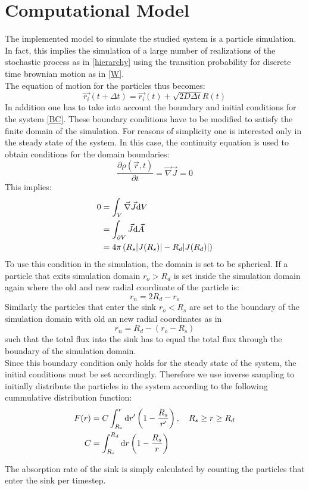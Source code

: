 \section{Computational Model}

The implemented model to simulate the studied system is a particle simulation. In fact, this implies the simulation of a large number of realizations of the stochastic process as in \eqref{hierarchy} using the transition probability for discrete time brownian motion as in \eqref{W}.\\
The equation of motion for the particles thus becomes:
\begin{equation}
    \vec{r_i}(t + \Delta t) = \vec{r_i}(t) + \sqrt{2 D \Delta t}R(t)
    \label{computational eqm}
\end{equation}
In addition one has to take into account the boundary and initial conditions for the system \eqref{BC}. These boundary conditions have to be modified to satisfy the finite domain of the simulation.
For reasons of simplicity one is interested only in the steady state of the system.
In this case, the continuity equation is used to obtain conditions for the domain boundaries:
\begin{equation}
    \frac{\partial \rho(\vec{r},t)}{\partial t} = \vec{\nabla} \vec{J} = 0
\end{equation}
This implies:
\begin{align}
    0   &= \int_V \vec{\nabla}\vec{J} {\rm d} V \nonumber \\
    &= \int_{\partial V} \vec{J} {\rm d} \vec{A} \nonumber \\
    &= 4 \pi \left( R_s |J(R_s)| - R_d |J(R_d)| \right)
\end{align}
To use this condition in the simulation, the domain is set to be spherical. If a particle that exits simulation domain $r_o > R_d$ is set inside the simulation domain again where the old and new radial coordinate of the particle is:
\begin{equation}
    r_n = 2 R_d - r_o
\end{equation}
Similarly the particles that enter the sink $r_o < R_s$ are set to the boundary of the simulation domain with old an new radial coordinates as in 
\begin{equation}
    r_n = R_d - (r_o - R_s)
\end{equation}
such that the total flux into the sink has to equal the total flux through the boundary of the simulation domain. \\
Since this boundary condition only holds for the steady state of the system, the initial conditions must be set accordingly. Therefore we use inverse sampling to initially distribute the particles in the system according to the following cummulative distribution function:
\begin{align}
    F(r) &= C \int_{R_s}^{r} {\rm d} r' \left( 1 - \frac{R_s}{r'} \right), \quad R_s \ge r \ge R_d \\
    C    &= \int_{R_s}^{R_d} {\rm d} r \left( 1 - \frac{R_s}{r} \right)
    \label{CDF}
\end{align}

The absorption rate of the sink is simply calculated by counting the particles that enter the sink per timestep.

